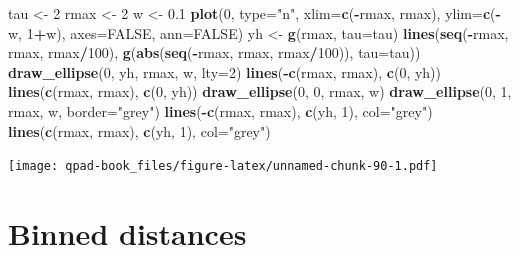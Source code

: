 \documentclass[12pt,]{book}
\newenvironment{Shaded}{\begin{snugshade}}{\end{snugshade}}
\newcommand{\DataTypeTok}[1]{\textcolor[rgb]{0.13,0.29,0.53}{#1}}
\newcommand{\DecValTok}[1]{\textcolor[rgb]{0.00,0.00,0.81}{#1}}
\newcommand{\FloatTok}[1]{\textcolor[rgb]{0.00,0.00,0.81}{#1}}
\newcommand{\KeywordTok}[1]{\textcolor[rgb]{0.13,0.29,0.53}{\textbf{#1}}}
\newcommand{\NormalTok}[1]{#1}
\newcommand{\OperatorTok}[1]{\textcolor[rgb]{0.81,0.36,0.00}{\textbf{#1}}}
\newcommand{\OtherTok}[1]{\textcolor[rgb]{0.56,0.35,0.01}{#1}}
\newcommand{\StringTok}[1]{\textcolor[rgb]{0.31,0.60,0.02}{#1}}
\begin{document}
\begin{Shaded}
\begin{Highlighting}[]
\NormalTok{tau <-}\StringTok{ }\DecValTok{2}
\NormalTok{rmax <-}\StringTok{ }\DecValTok{2}
\NormalTok{w <-}\StringTok{ }\FloatTok{0.1}
\KeywordTok{plot}\NormalTok{(}\DecValTok{0}\NormalTok{, }\DataTypeTok{type=}\StringTok{"n"}\NormalTok{, }\DataTypeTok{xlim=}\KeywordTok{c}\NormalTok{(}\OperatorTok{-}\NormalTok{rmax, rmax), }\DataTypeTok{ylim=}\KeywordTok{c}\NormalTok{(}\OperatorTok{-}\NormalTok{w, }\DecValTok{1}\OperatorTok{+}\NormalTok{w), }\DataTypeTok{axes=}\OtherTok{FALSE}\NormalTok{, }\DataTypeTok{ann=}\OtherTok{FALSE}\NormalTok{)}
\NormalTok{yh <-}\StringTok{ }\KeywordTok{g}\NormalTok{(rmax, }\DataTypeTok{tau=}\NormalTok{tau)}
\KeywordTok{lines}\NormalTok{(}\KeywordTok{seq}\NormalTok{(}\OperatorTok{-}\NormalTok{rmax, rmax, rmax}\OperatorTok{/}\DecValTok{100}\NormalTok{),}
  \KeywordTok{g}\NormalTok{(}\KeywordTok{abs}\NormalTok{(}\KeywordTok{seq}\NormalTok{(}\OperatorTok{-}\NormalTok{rmax, rmax, rmax}\OperatorTok{/}\DecValTok{100}\NormalTok{)), }\DataTypeTok{tau=}\NormalTok{tau))}
\KeywordTok{draw_ellipse}\NormalTok{(}\DecValTok{0}\NormalTok{, yh, rmax, w, }\DataTypeTok{lty=}\DecValTok{2}\NormalTok{)}
\KeywordTok{lines}\NormalTok{(}\OperatorTok{-}\KeywordTok{c}\NormalTok{(rmax, rmax), }\KeywordTok{c}\NormalTok{(}\DecValTok{0}\NormalTok{, yh))}
\KeywordTok{lines}\NormalTok{(}\KeywordTok{c}\NormalTok{(rmax, rmax), }\KeywordTok{c}\NormalTok{(}\DecValTok{0}\NormalTok{, yh))}
\KeywordTok{draw_ellipse}\NormalTok{(}\DecValTok{0}\NormalTok{, }\DecValTok{0}\NormalTok{, rmax, w)}
\KeywordTok{draw_ellipse}\NormalTok{(}\DecValTok{0}\NormalTok{, }\DecValTok{1}\NormalTok{, rmax, w, }\DataTypeTok{border=}\StringTok{"grey"}\NormalTok{)}
\KeywordTok{lines}\NormalTok{(}\OperatorTok{-}\KeywordTok{c}\NormalTok{(rmax, rmax), }\KeywordTok{c}\NormalTok{(yh, }\DecValTok{1}\NormalTok{), }\DataTypeTok{col=}\StringTok{"grey"}\NormalTok{)}
\KeywordTok{lines}\NormalTok{(}\KeywordTok{c}\NormalTok{(rmax, rmax), }\KeywordTok{c}\NormalTok{(yh, }\DecValTok{1}\NormalTok{), }\DataTypeTok{col=}\StringTok{"grey"}\NormalTok{)}
\end{Highlighting}
\end{Shaded}

\texttt{[image: qpad-book\_files/figure-latex/unnamed-chunk-90-1.pdf]}

\hypertarget{binned-distances}{%
\section{Binned distances}\label{binned-distances}}
\end{document}
